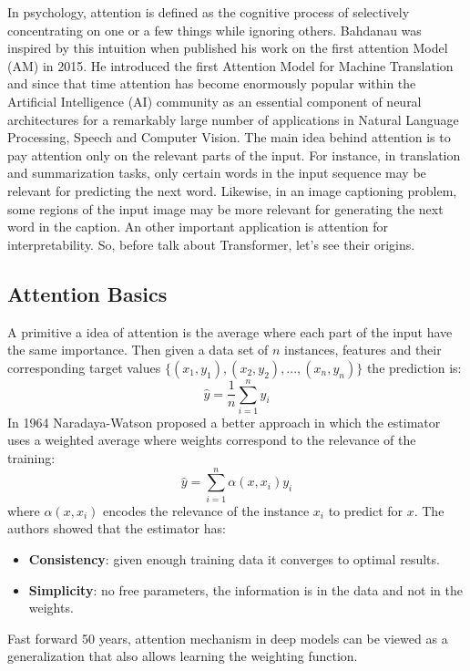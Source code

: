 \documentclass[11pt]{article}
\begin{document}
In psychology, attention is defined as the cognitive process of selectively concentrating on one or a few things while ignoring others. Bahdanau was inspired by this intuition when published his work on the first attention Model (AM) in 2015. He introduced the first Attention Model for Machine Translation \cite{Bahdanau} and since that time attention has become enormously popular within the Artificial Intelligence (AI) community as an essential component of neural architectures for a remarkably large number of applications in Natural Language Processing, Speech and Computer Vision. The main idea behind attention is to pay attention only on the relevant parts of the input. For instance, in translation and summarization tasks, only certain words in the input sequence may be relevant for predicting the next word. Likewise, in an image captioning problem, some regions of the input image may be more relevant for generating the next word in the caption. An other important application is attention for interpretability. So, before talk about Transformer, let's see their origins.

\subsection{Attention Basics}
A primitive a idea of attention is the average where each part of the input have the same importance. Then given a data set of $n$ instances, features and their corresponding target values $\{(x_1, y_1), (x_2, y_2), ..., (x_n, y_n)\}$ the prediction is:
\begin{displaymath}
\hat{y} = \frac{1}{n} \sum_{i=1}^n y_i
\end{displaymath}
In 1964 Naradaya-Watson proposed a better approach in which the estimator uses a weighted average where weights correspond to the relevance of the training:  
\begin{displaymath}
\hat{y} = \sum_{i=1}^n \alpha (x, x_i) y_i
\end{displaymath}
where $\alpha (x, x_i)$ encodes the relevance of the instance $x_i$ to predict for $x$.  The authors showed that the estimator has:
\begin{itemize}
\item \textbf{Consistency}: given enough training data it converges to optimal results.
\item \textbf{Simplicity}: no free parameters, the information is in the data and not in the weights. 
\end{itemize}
Fast forward 50 years, attention mechanism in deep models can be viewed as a generalization that also allows learning the weighting function. 
\end{document}
